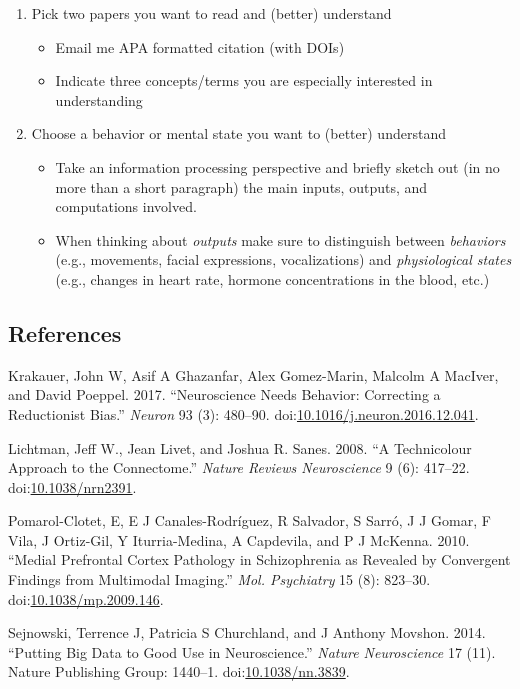 \documentclass[]{article}
\providecommand{\tightlist}{%
  \setlength{\itemsep}{0pt}\setlength{\parskip}{0pt}}
\begin{document}
\begin{enumerate}
\def\labelenumi{\arabic{enumi}.}
\tightlist
\item
  Pick two papers you want to read and (better) understand

  \begin{itemize}
  \tightlist
  \item
    Email me APA formatted citation (with DOIs)
  \item
    Indicate three concepts/terms you are especially interested in
    understanding
  \end{itemize}
\item
  Choose a behavior or mental state you want to (better) understand

  \begin{itemize}
  \tightlist
  \item
    Take an information processing perspective and briefly sketch out
    (in no more than a short paragraph) the main inputs, outputs, and
    computations involved.
  \item
    When thinking about \emph{outputs} make sure to distinguish between
    \emph{behaviors} (e.g., movements, facial expressions,
    vocalizations) and \emph{physiological states} (e.g., changes in
    heart rate, hormone concentrations in the blood, etc.)
  \end{itemize}
\end{enumerate}

\subsection*{References}\label{references}

\hypertarget{refs}{}
\hypertarget{ref-Krakauer2017-xl}{}
Krakauer, John W, Asif A Ghazanfar, Alex Gomez-Marin, Malcolm A MacIver,
and David Poeppel. 2017. ``Neuroscience Needs Behavior: Correcting a
Reductionist Bias.'' \emph{Neuron} 93 (3): 480--90.
doi:\href{https://doi.org/10.1016/j.neuron.2016.12.041}{10.1016/j.neuron.2016.12.041}.

\hypertarget{ref-lichtman_technicolour_2008}{}
Lichtman, Jeff W., Jean Livet, and Joshua R. Sanes. 2008. ``A
Technicolour Approach to the Connectome.'' \emph{Nature Reviews
Neuroscience} 9 (6): 417--22.
doi:\href{https://doi.org/10.1038/nrn2391}{10.1038/nrn2391}.

\hypertarget{ref-Pomarol-Clotet2010-tq}{}
Pomarol-Clotet, E, E J Canales-Rodríguez, R Salvador, S Sarró, J J
Gomar, F Vila, J Ortiz-Gil, Y Iturria-Medina, A Capdevila, and P J
McKenna. 2010. ``Medial Prefrontal Cortex Pathology in Schizophrenia as
Revealed by Convergent Findings from Multimodal Imaging.'' \emph{Mol.
Psychiatry} 15 (8): 823--30.
doi:\href{https://doi.org/10.1038/mp.2009.146}{10.1038/mp.2009.146}.

\hypertarget{ref-sejnowski2014putting}{}
Sejnowski, Terrence J, Patricia S Churchland, and J Anthony Movshon.
2014. ``Putting Big Data to Good Use in Neuroscience.'' \emph{Nature
Neuroscience} 17 (11). Nature Publishing Group: 1440--1.
doi:\href{https://doi.org/10.1038/nn.3839}{10.1038/nn.3839}.
\end{document}

